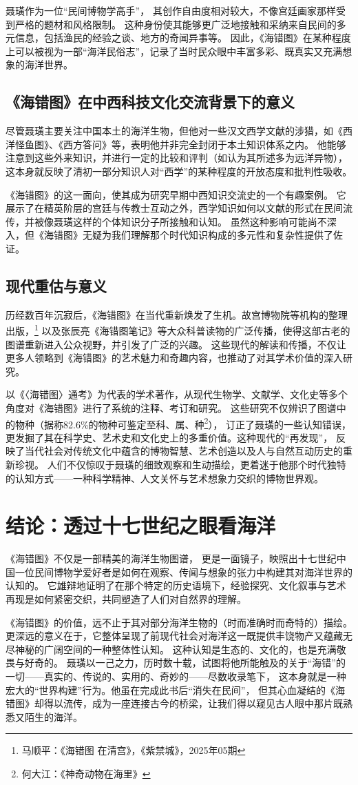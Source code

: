 \documentclass{source/Paper}
\begin{document}
聂璜作为一位“民间博物学高手”，
其创作自由度相对较大，不像宫廷画家那样受到严格的题材和风格限制。
这种身份使其能够更广泛地接触和采纳来自民间的多元信息，包括渔民的经验之谈、地方的奇闻异事等。
因此，《海错图》在某种程度上可以被视为一部“海洋民俗志”，记录了当时民众眼中丰富多彩、既真实又充满想象的海洋世界。
\subsection{《海错图》在中西科技文化交流背景下的意义}
尽管聂璜主要关注中国本土的海洋生物，但他对一些汉文西学文献的涉猎，如《西洋怪鱼图》、《西方答问》等，表明他并非完全封闭于本土知识体系之内。
他能够注意到这些外来知识，并进行一定的比较和评判（如认为其所述多为远洋异物），这本身就反映了清初一部分知识人对“西学”的某种程度的开放态度和批判性吸收。

《海错图》的这一面向，使其成为研究早期中西知识交流史的一个有趣案例。
它展示了在精英阶层的宫廷与传教士互动之外，西学知识如何以文献的形式在民间流传，并被像聂璜这样的个体知识分子所接触和认知。
虽然这种影响可能尚不深入，但《海错图》无疑为我们理解那个时代知识构成的多元性和复杂性提供了佐证。
\subsection{现代重估与意义}
历经数百年沉寂后，《海错图》在当代重新焕发了生机。故宫博物院等机构的整理出版，\footnote{马顺平：《\textlangle 海错图 \textrangle 在清宫》，《紫禁城》，2025年05期}
以及张辰亮《海错图笔记》等大众科普读物的广泛传播，使得这部古老的图谱重新进入公众视野，并引发了广泛的兴趣。
这些现代的解读和传播，不仅让更多人领略到《海错图》的艺术魅力和奇趣内容，也推动了对其学术价值的深入研究。

以《〈海错图〉通考》为代表的学术著作，从现代生物学、文献学、文化史等多个角度对《海错图》进行了系统的注释、考订和研究。
这些研究不仅辨识了图谱中的物种（据称82.6\%的物种可鉴定至科、属、种\footnote{何大江：《神奇动物在海里》}），
订正了聂璜的一些认知错误，更发掘了其在科学史、艺术史和文化史上的多重价值。这种现代的“再发现”，
反映了当代社会对传统文化中蕴含的博物智慧、艺术创造以及人与自然互动历史的重新珍视。
人们不仅惊叹于聂璜的细致观察和生动描绘，更着迷于他那个时代独特的认知方式——一种科学精神、人文关怀与艺术想象力交织的博物世界观。
\section{结论：透过十七世纪之眼看海洋}
《海错图》不仅是一部精美的海洋生物图谱，
更是一面镜子，映照出十七世纪中国一位民间博物学爱好者是如何在观察、传闻与想象的张力中构建其对海洋世界的认知的。
它雄辩地证明了在那个特定的历史语境下，经验探究、文化叙事与艺术再现是如何紧密交织，共同塑造了人们对自然界的理解。

《海错图》的价值，远不止于其对部分海洋生物的（时而准确时而奇特的）描绘。
更深远的意义在于，它整体呈现了前现代社会对海洋这一既提供丰饶物产又蕴藏无尽神秘的广阔空间的一种整体性认知。
这种认知是生态的、文化的，也是充满敬畏与好奇的。
聂璜以一己之力，历时数十载，试图将他所能触及的关于“海错”的一切——真实的、传说的、实用的、奇妙的——尽数收录笔下，
这本身就是一种宏大的“世界构建”行为。他虽在完成此书后“消失在民间”，
但其心血凝结的《海错图》却得以流传，成为一座连接古今的桥梁，让我们得以窥见古人眼中那片既熟悉又陌生的海洋。
\end{document}
